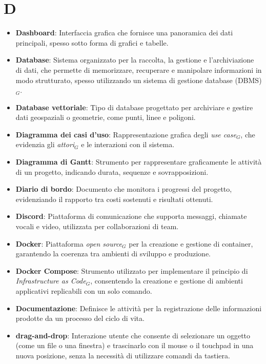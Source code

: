\section{D}
\begin{itemize}
    \item \textbf{Dashboard}: Interfaccia grafica che fornisce una panoramica dei dati principali, spesso sotto forma di grafici e tabelle.
    \item \textbf{Database}: Sistema organizzato per la raccolta, la gestione e l'archiviazione di dati, che permette di memorizzare, recuperare e manipolare informazioni in modo strutturato, spesso utilizzando un sistema di gestione database (DBMS)$_G$.
    \item \textbf{Database vettoriale}: Tipo di database progettato per archiviare e gestire dati geospaziali o geometrie, come punti, linee e poligoni.
    \item \textbf{Diagramma dei casi d’uso}: Rappresentazione grafica degli \textit{use case}$_G$, che evidenzia gli \textit{attori}$_G$ e le interazioni con il sistema.
    \item \textbf{Diagramma di Gantt}: Strumento per rappresentare graficamente le attività di un progetto, indicando durata, sequenze e sovrapposizioni.
    \item \textbf{Diario di bordo}: Documento che monitora i progressi del progetto, evidenziando il rapporto tra costi sostenuti e risultati ottenuti.
    \item \textbf{Discord}: Piattaforma di comunicazione che supporta messaggi, chiamate vocali e video, utilizzata per collaborazioni di team.
    \item \textbf{Docker}: Piattaforma \textit{open source}$_G$ per la creazione e gestione di container, garantendo la coerenza tra ambienti di sviluppo e produzione.
    \item \textbf{Docker Compose}: Strumento utilizzato per implementare il principio di \textit{Infrastructure as Code}$_G$, consentendo la creazione e gestione di ambienti applicativi replicabili con un solo comando.
    \item \textbf{Documentazione}: Definisce le attività per la registrazione delle informazioni prodotte da un processo del ciclo di vita.
    \item \textbf{drag-and-drop}: Interazione utente che consente di selezionare un oggetto (come un file o una finestra) e trascinarlo con il mouse o il touchpad in una nuova posizione, senza la necessità di utilizzare comandi da tastiera.
\end{itemize}

